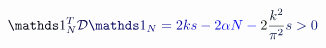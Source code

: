 \documentclass[12pt]{article}
\begin{document}
\makeatletter
\renewcommand*{\@textcolor}[3]{%
  \protect\leavevmode
  \begingroup
    \color#1{#2}#3%
  \endgroup
}
\makeatother
\begin{displaymath}
\mathcolor[RGB]{0,0,15}{\mathds} { \mathcolor[RGB]{0,0,30}{1} } _ { \mathcolor[RGB]{0,0,45}{N} } ^ { \mathcolor[RGB]{0,0,60}{T} } \mathcal { \mathcolor[RGB]{0,0,75}{D} } \mathcolor[RGB]{0,0,90}{\mathds} { \mathcolor[RGB]{0,0,105}{1} } _ { \mathcolor[RGB]{0,0,120}{N} } \mathcolor[RGB]{0,0,135}{=} \mathcolor[RGB]{0,0,150}{2} \mathcolor[RGB]{0,0,165}{k} \mathcolor[RGB]{0,0,180}{s} \mathcolor[RGB]{0,0,195}{-} \mathcolor[RGB]{0,0,210}{2} \mathcolor[RGB]{0,0,225}{\alpha} \mathcolor[RGB]{0,0,240}{N} \mathcolor[RGB]{0,0,255}{-} \mathcolor[RGB]{0,15,0}{2} \mathcolor[RGB]{0,15,15}{\frac { \mathcolor[RGB]{0,15,30}{k} ^ { \mathcolor[RGB]{0,15,45}{2} } } { \mathcolor[RGB]{0,15,60}{\pi} ^ { \mathcolor[RGB]{0,15,75}{2} } } } \mathcolor[RGB]{0,15,90}{s} \mathcolor[RGB]{0,15,105}{>} \mathcolor[RGB]{0,15,120}{0}
\end{displaymath}
\end{document}
